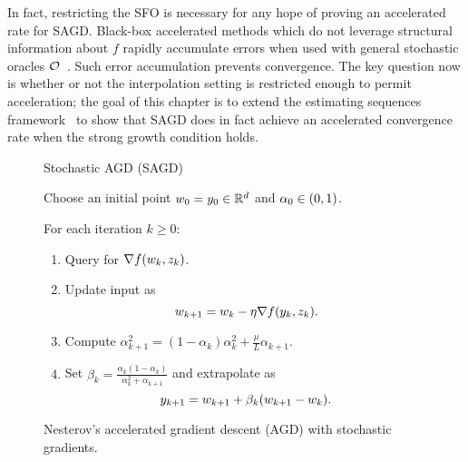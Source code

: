In fact, restricting the \ac{SFO} is necessary for any hope of proving an accelerated rate for \ac{SAGD}.
Black-box accelerated methods which do not leverage structural information about \( f \) rapidly accumulate errors when used with general stochastic oracles \( \oracle{} \)~\citep{devolder2014first, schmidt2011convergence}. 
Such error accumulation prevents convergence. 
The key question now is whether or not the interpolation setting is restricted enough to permit acceleration;
the goal of this chapter is to extend the estimating sequences framework~\citep{nesterov2004lectures} to show that \ac{SAGD} does in fact achieve an accelerated convergence rate when the strong growth condition holds.

\begin{figure}[t]
    \centering
    \begin{procedure}{Stochastic \ac{AGD} (\ac{SAGD})}
    \item Choose an initial point \( \w_0 = y_0 \in \R^d \) and \( \alpha_0 \in \rbr{0,1} \).
        \item For each iteration \( k \geq 0 \):
            \begin{enumerate}
                \item Query \oracle{} for \( \grad(\wk, \zk) \). 
                \item Update input as\vspace{-1ex}%
                \[ \wkk = \wk - \eta \grad(\yk, \zk). \]
                \item Compute 
                    \( \alpha_{k+1}^2 = (1 - \alpha_k)\alpha_k^2 + \frac{\mu}{L} \alpha_{k+1} \).
                \item Set \( \beta_{k} = \frac{\alpha_k (1-\alpha_k)}{\alpha_k^2 + \alpha_{k+1}} \) and extrapolate as
                    \[ \ykk = \wkk + \beta_k (\wkk - \wk).  \] 
            \end{enumerate}
    \end{procedure}
    \caption{Nesterov's accelerated gradient descent (AGD) with stochastic gradients.}%
    \label{procedure:accelerated-sgd}
\end{figure} 

